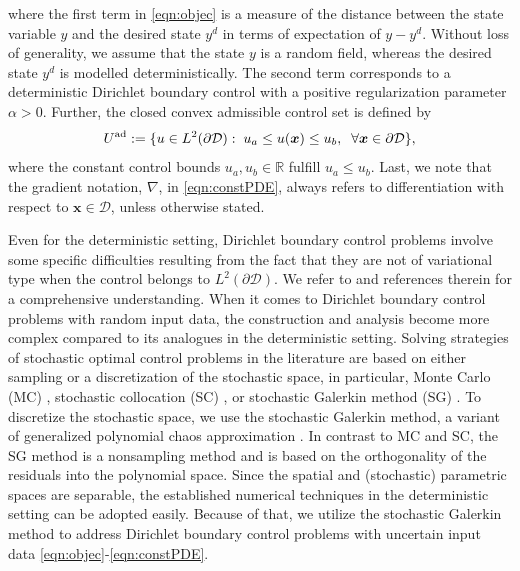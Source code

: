 \documentclass[a4paper,10pt]{article}
\newcommand{\bx}{{\boldsymbol{x}}}
\newcommand{\cD}{{\mathcal{D}}}
\numberwithin{theorem}{section}
\begin{document}
where the first term in \eqref{eqn:objec} is a measure of the distance between the state variable $y$ and the desired state $y^d$ in terms of expectation of $y-y^d$. Without loss of generality, we assume that the state $y$ is a random field, whereas the desired state $y^d$ is modelled deterministically. The second term  corresponds to a deterministic Dirichlet boundary control with a positive regularization parameter $\alpha >0 $.  Further, the closed convex admissible control set is defined by
\begin{equation}\label{defn:admis_space}
	U^{\textup{ad}} :=  \{ u \in L^2(\partial \cD) : \; u_a \leq  u(\boldsymbol{x}) \leq u_b, \;\; \forall \boldsymbol{x} \in \partial \mathcal{D} \},
\end{equation}
where the constant control bounds $u_a, u_b \in \mathbb{R}$ fulfill $u_a \leq u_b$. Last, we note that the gradient notation, $\nabla$, in \eqref{eqn:constPDE}, always refers to differentiation with respect to $\bx \in \cD$, unless otherwise stated.

Even for the deterministic setting,  Dirichlet boundary control problems involve some specific difficulties resulting from the fact that they are not of variational type when the control belongs to $L^2(\partial \cD)$. We refer to \cite{TApel_MMateos_JPfefferer_ARosch_2015,TApel_MMateos_JPfefferer_ARosch_2018,MBerggren_2004a,ECasas_JPRaymond_2006b,KDeckelnick_AGunther_MHinze_2009,MDGunzburger_SManservisi_2000a,SMay_RRannacher_BVexler_2013,MWinkler_2020} and references therein for a comprehensive understanding. When it comes to Dirichlet boundary control problems with random input data, the construction and analysis become more complex compared to its analogues in the deterministic setting. Solving strategies of stochastic optimal control problems in the literature are based on either sampling  or a discretization of the stochastic space, in particular, Monte Carlo (MC) \cite{AAAli_EUllman_MHinze_2017,PAGuth_VKaarnioja_FYKuo_CSchillings_IHSloan_2021a,AVBarel_SVandewalle_2019}, stochastic collocation (SC) \cite{ABorzi_GvonWinckel_2009a,HTiesler_RMKirby_DXiu_TPreusser_2012a,ERosseel_GNWells_2012}, or stochastic Galerkin method (SG) \cite{IBabuska_RTempone_GEZouraris_2004a,HCLee_JLee_2013,ERosseel_GNWells_2012}. To discretize the stochastic space, we use the stochastic Galerkin method, a variant of generalized polynomial chaos approximation \cite{DXiu_GEKarniadakis_2002}. In contrast to MC and SC, the SG  method is a nonsampling method and is based on the orthogonality of the  residuals into the polynomial space. Since the spatial and (stochastic) parametric spaces are separable,  the established numerical techniques in the deterministic setting can be adopted easily. Because of that, we utilize the stochastic Galerkin method to address Dirichlet boundary control problems with uncertain input data \eqref{eqn:objec}-\eqref{eqn:constPDE}.
\end{document}
